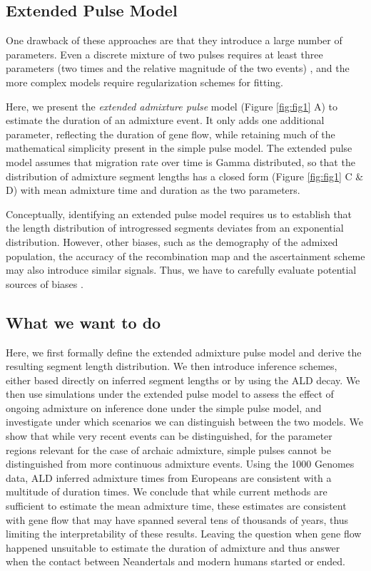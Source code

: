 \documentclass[]{article}
\begin{document}
\subsection{Extended Pulse Model}

One drawback of  these approaches are that they introduce a large number of parameters. Even a discrete mixture of two pulses requires at least three parameters (two times and the relative magnitude of the two events) \citep{pickrell_ancient_2014}, and the more complex models require regularization schemes for fitting.

Here, we present the \emph{extended admixture pulse} model (Figure \ref{fig:fig1} A) to estimate the duration of an admixture event. It only adds one additional parameter, reflecting the duration of gene flow, while retaining much of the mathematical simplicity present in the simple pulse model. 
The extended pulse model assumes that migration rate over time is Gamma distributed, so that the  distribution of admixture segment lengths has a closed form (Figure \ref{fig:fig1} C \& D) with mean admixture time and duration as the two parameters.

Conceptually, identifying an extended pulse model requires us to establish that the length distribution of introgressed segments deviates from an exponential distribution. However, other biases, such as the demography of the admixed population, the accuracy of the recombination map and the ascertainment scheme may also introduce similar signals. Thus, we have to carefully evaluate potential sources of biases  \citep{sankararaman_date_2012,fu_genome_2014,moorjani_genetic_2016}. 


\subsection{What we want to do}\label{what-we-want-to-do}

Here, we first formally define the extended admixture pulse model and derive the resulting segment length distribution. We then introduce inference schemes, either based directly on inferred segment lengths or by using the ALD decay. 
We then use simulations under the extended pulse model to assess the effect of ongoing admixture on inference done under the simple pulse model, and investigate under which scenarios we can distinguish between the two models. We show that while very recent events can be distinguished, for the parameter regions relevant for the  case of archaic admixture, simple pulses cannot be distinguished from more continuous admixture events. Using the 1000 Genomes data, ALD inferred admixture times from Europeans are consistent with a multitude of duration times.
We conclude that while current methods are sufficient to estimate the mean admixture time, these estimates are consistent with gene flow that may have spanned several tens of thousands of years, thus limiting the interpretability of these results. Leaving the question when gene flow happened unsuitable to estimate the duration of admixture and thus answer when the contact between Neandertals and modern humans started or ended.
\end{document}
